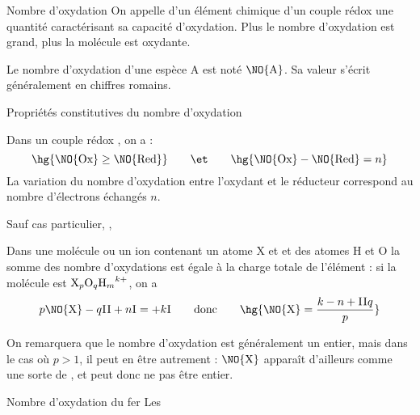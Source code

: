     \begin{definition}{Nombre d'oxydation}{}
        On appelle  d'un élément chimique d'un couple rédox une quantité caractérisant sa capacité d'oxydation. Plus le nombre d'oxydation est grand, plus la molécule est oxydante.
    \end{definition}
    \begin{notation}
        Le nombre d'oxydation d'une espèce $\text{A}$ est noté $\NO{\text{A}}$. Sa valeur s'écrit généralement en chiffres romains.
    \end{notation}
    \begin{property}{Propriétés constitutives du nombre d'oxydation}{}
        \begin{enumerate}
            \itast Dans un couple rédox , on a :
            \[ \hg{\NO{\text{Ox}} \geq \NO{\text{Red}}} \qquad\et\qquad \hg{\NO{\text{Ox}} - \NO{\text{Red}} = n} \]
            La variation du nombre d'oxydation entre l'oxydant et le réducteur correspond au nombre d'électrons échangés $n$.
            
            \itast Sauf cas particulier, , 
            
            \itast Dans une molécule ou un ion contenant un atome $\text{X}$ et et des atomes $\text{H}$ et $\text{O}$ la somme des nombre d'oxydations est égale à la charge totale de l'élément : si la molécule est ${\text X_p\text O_q \text H_m}^{k+}$, on a 
            \[ p\NO{\text X} -q\textsc{II} + n\textsc{I} = +k\textsc{I} \qquad\text{donc}\qquad \hg{\NO{\text X} = \dfrac{k - n + \textsc{II}q}{p}}\]
        \end{enumerate}
    \end{property}
    
    On remarquera que le nombre d'oxydation est généralement un entier, mais dans le cas où $p > 1$, il peut en être autrement : $\NO{\text X}$ apparaît d'ailleurs comme une sorte de , et peut donc ne pas être entier.
    
    \begin{example}{Nombre d'oxydation du fer}{}
        Les 
        \begin{enumerate}
            \itt {}
            \itt {}
            \itt {}
            \itt {}
            \itt {}
            \itt {}
        \end{enumerate}
    \end{example}
    
